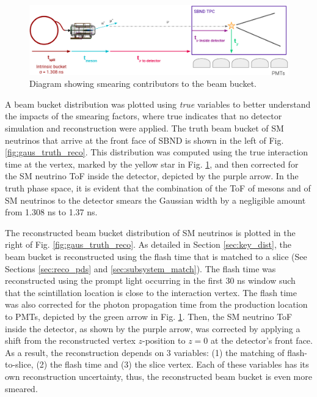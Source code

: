 \begin{figure}[h!]
    \centering
    \includegraphics[width=1.0\textwidth]{smearing_factors.png}
    \caption[Smearing Contributors To The Beam Bucket Diagram]{Diagram showing smearing contributors to the beam bucket.}
    \label{fig:smearing_factors}
\end{figure}

A beam bucket distribution was plotted using \textit{true} variables to better understand the impacts of the smearing factors, where true indicates that no detector simulation and reconstruction were applied.
The truth beam bucket of SM neutrinos that arrive at the front face of SBND is shown in the left of Fig. \ref{fig:gaus_truth_reco}.
This distribution was computed using the true interaction time at the vertex, marked by the yellow star in Fig. \ref{fig:smearing_factors}, and then corrected for the SM neutrino ToF inside the detector, depicted by the purple arrow.
In the truth phase space, it is evident that the combination of the ToF of mesons and of SM neutrinos to the detector smears the Gaussian width by a negligible amount from 1.308 ns to 1.37 ns.

The reconstructed beam bucket distribution of SM neutrinos is plotted in the right of Fig. \ref{fig:gaus_truth_reco}.
As detailed in Section \ref{sec:key_dist}, the beam bucket is reconstructed using the flash time that is matched to a slice (See Sections \ref{sec:reco_pds} and \ref{sec:subsystem_match}).
The flash time was reconstructed using the prompt light occurring in the first 30 ns window such that the scintillation location is close to the interaction vertex.
The flash time was also corrected for the photon propagation time from the production location to PMTs, depicted by the green arrow in Fig. \ref{fig:smearing_factors}.
Then, the SM neutrino ToF inside the detector, as shown by the purple arrow, was corrected by applying a shift from the reconstructed vertex $z$-position to $z = 0$ at the detector's front face.
As a result, the reconstruction depends on 3 variables: (1) the matching of flash-to-slice, (2) the flash time and (3) the slice vertex.
Each of these variables has its own reconstruction uncertainty, thus, the reconstructed beam bucket is even more smeared.

